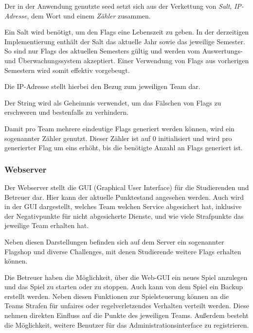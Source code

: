 Der in der Anwendung genutzte seed setzt sich aus der Verkettung von \textit{Salt}, \textit{IP-Adresse}, dem Wort  und einem \textit{Zähler} zusammen.

Ein Salt wird benötigt, um den Flags eine Lebenszeit zu geben. In der derzeitigen Implementierung enthält der Salt das aktuelle Jahr sowie das jeweilige Semester. So sind nur Flags des aktuellen Semesters gültig und werden vom Auswertungs- und Überwachungssystem akzeptiert. Einer Verwendung von Flags aus vorherigen Semestern wird somit effektiv vorgebeugt.

Die IP-Adresse stellt hierbei den Bezug zum jeweiligen Team dar.

Der String  wird als Geheimnis verwendet, um das Fälschen von Flags zu erschweren und bestenfalls zu verhindern.

Damit pro Team mehrere eindeutige Flags generiert werden können, wird ein sogenannter Zähler genutzt. Dieser Zähler ist auf 0 initialisiert und wird pro generierter Flag um eins erhöht, bis die benötigte Anzahl an Flags generiert ist.\cite[S.48]{sosnaKonzeptionUndRealisierung2010}

\subsubsection{Webserver}\label{subsubsec:Webserver}

Der Webserver stellt die GUI (Graphical User Interface) für die Studierenden und Betreuer dar. Hier kann der aktuelle Punktestand angesehen werden. Auch wird in der GUI dargestellt, welches Team welchen Service abgesichert hat, inklusive der Negativpunkte für nicht abgesicherte Dienste, und wie viele Strafpunkte das jeweilige Team erhalten hat.

Neben diesen Darstellungen befinden sich auf dem Server ein sogenannter Flagshop und diverse Challenges, mit denen Studierende weitere Flags erhalten können.

Die Betreuer haben die Möglichkeit, über die Web-GUI ein neues Spiel anzulegen und das Spiel zu starten oder zu stoppen. Auch kann von dem Spiel ein Backup erstellt werden. Neben diesen Funktionen zur Spielsteuerung können an die Teams Strafen für unfaires oder regelverletzendes Verhalten verteilt werden. Diese nehmen direkten Einfluss auf die Punkte des jeweiligen Teams. Außerdem besteht die Möglichkeit, weitere Benutzer für das Administrationsinterface zu registrieren.

